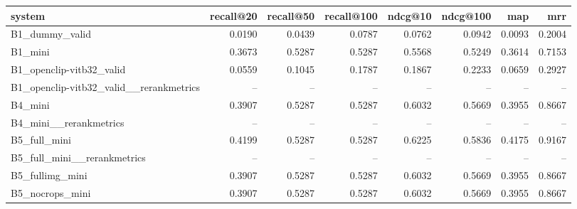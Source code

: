 \begin{tabular}{lrrrrrrr}
\toprule
system & recall@20 & recall@50 & recall@100 & ndcg@10 & ndcg@100 & map & mrr \\
\midrule
B1\_dummy\_valid & 0.0190 & 0.0439 & 0.0787 & 0.0762 & 0.0942 & 0.0093 & 0.2004 \\
B1\_mini & 0.3673 & 0.5287 & 0.5287 & 0.5568 & 0.5249 & 0.3614 & 0.7153 \\
B1\_openclip-vitb32\_valid & 0.0559 & 0.1045 & 0.1787 & 0.1867 & 0.2233 & 0.0659 & 0.2927 \\
B1\_openclip-vitb32\_valid\_\_rerankmetrics & -- & -- & -- & -- & -- & -- & -- \\
B4\_mini & 0.3907 & 0.5287 & 0.5287 & 0.6032 & 0.5669 & 0.3955 & 0.8667 \\
B4\_mini\_\_rerankmetrics & -- & -- & -- & -- & -- & -- & -- \\
B5\_full\_mini & 0.4199 & 0.5287 & 0.5287 & 0.6225 & 0.5836 & 0.4175 & 0.9167 \\
B5\_full\_mini\_\_rerankmetrics & -- & -- & -- & -- & -- & -- & -- \\
B5\_fullimg\_mini & 0.3907 & 0.5287 & 0.5287 & 0.6032 & 0.5669 & 0.3955 & 0.8667 \\
B5\_nocrops\_mini & 0.3907 & 0.5287 & 0.5287 & 0.6032 & 0.5669 & 0.3955 & 0.8667 \\
\bottomrule
\end{tabular}